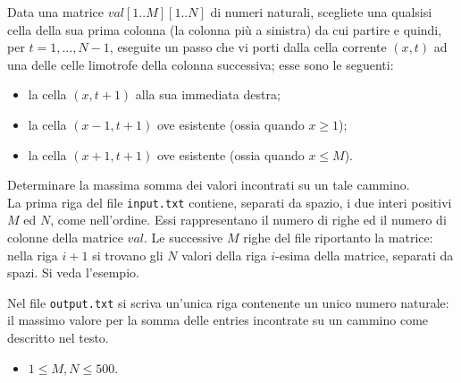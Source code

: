 \renewcommand{\nomebreve}{rightwards}
\renewcommand{\titolo}{Procedi verso destra}

\introduzione{}

Data una matrice $val[1..M][1..N]$ di numeri naturali,
scegliete una qualsisi cella della sua prima colonna (la colonna pi\`u a sinistra) da cui partire
e quindi,
per $t=1,\ldots, N-1$,
eseguite un passo che vi porti dalla cella corrente $(x,t)$
ad una delle celle limotrofe della colonna successiva;
esse sono le seguenti:
\begin{itemize}
   \item la cella $(x,t+1)$ alla sua immediata destra;
   \item la cella $(x-1, t+1)$ ove esistente (ossia quando $x\geq 1$);
   \item la cella $(x+1, t+1)$ ove esistente (ossia quando $x\leq M$).
\end{itemize}     
Determinare la massima somma dei valori incontrati su un tale cammino.\\


La prima riga del file \verb'input.txt' contiene, separati da spazio, i due interi positivi $M$ ed $N$, come nell'ordine. Essi rappresentano il numero di righe ed il numero di colonne della matrice $val$.
Le successive $M$ righe del file riportanto la matrice:
nella riga $i+1$ si trovano gli $N$ valori della riga $i$-esima della matrice, separati da spazi.
Si veda l'esempio.

Nel file \verb'output.txt' si scriva un'unica riga contenente
un unico numero naturale: il massimo valore per la somma delle entries
incontrate su un cammino come descritto nel testo.\\





\begin{itemize}[nolistsep, noitemsep]
  \item $1 \le M,N \le 500$.
\end{itemize}
  
